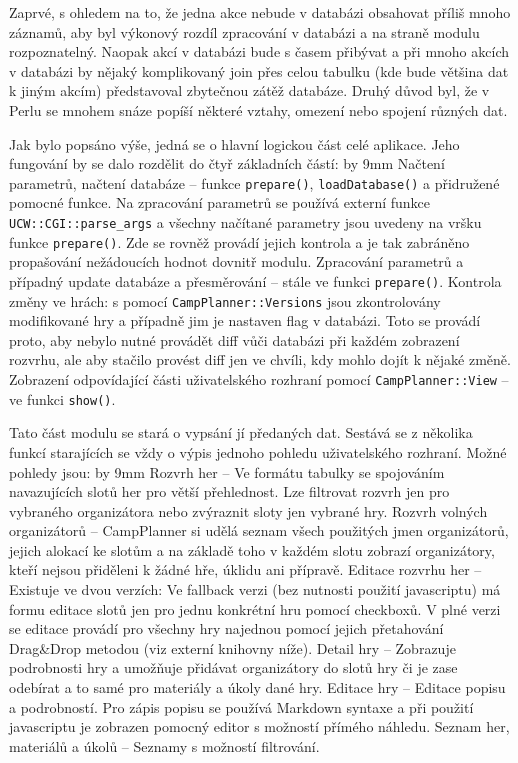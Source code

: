 Zaprvé, s ohledem na to, že jedna akce nebude v databázi obsahovat příliš mnoho
záznamů, aby byl výkonový rozdíl zpracování v databázi a na straně modulu
rozpoznatelný. Naopak akcí v databázi bude s časem přibývat a při mnoho akcích v
databázi by nějaký komplikovaný join přes celou tabulku (kde bude většina dat k
jiným akcím) představoval zbytečnou zátěž databáze. Druhý důvod byl, že v Perlu
se mnohem snáze popíší některé vztahy, omezení nebo spojení různých dat.


Jak bylo popsáno výše, jedná se o hlavní logickou část celé aplikace. Jeho
fungování by se dalo rozdělit do čtyř základních částí:
\itemize\ibull
\advance\hsize by 9mm
\: Načtení parametrů, načtení databáze -- funkce \verb|prepare()|, \verb|loadDatabase()|
a přidružené pomocné funkce. Na zpracování parametrů se používá externí
funkce \verb|UCW::CGI::parse_args| a všechny načítané parametry jsou uvedeny na
vršku funkce \verb|prepare()|. Zde se rovněž provádí jejich kontrola a je tak
zabráněno propašování nežádoucích hodnot dovnitř modulu.
\: Zpracování parametrů a případný update databáze a přesměrování -- stále ve
funkci \verb|prepare()|.
\: Kontrola změny ve hrách: s pomocí \verb|CampPlanner::Versions| jsou zkontrolovány
modifikované hry a případně jim je nastaven flag v databázi. Toto se provádí proto,
aby nebylo nutné provádět diff vůči databázi při každém zobrazení rozvrhu, ale
aby stačilo provést diff jen ve chvíli, kdy mohlo dojít k nějaké změně.
\: Zobrazení odpovídající části uživatelského rozhraní pomocí \verb|CampPlanner::View|
-- ve funkci \verb|show()|.
\endlist


Tato část modulu se stará o vypsání jí předaných dat. Sestává se z několika
funkcí starajících se vždy o výpis jednoho pohledu uživatelského rozhraní. Možné
pohledy jsou:
\itemize\ibull
\advance\hsize by 9mm
\: Rozvrh her -- Ve formátu tabulky se spojováním navazujících slotů her pro větší
přehlednost. Lze filtrovat rozvrh jen pro vybraného organizátora nebo zvýraznit
sloty jen vybrané hry.
\: Rozvrh volných organizátorů -- CampPlanner si udělá seznam všech použitých
jmen organizátorů, jejich alokací ke slotům a na základě toho v každém slotu
zobrazí organizátory, kteří nejsou přiděleni k žádné hře, úklidu ani přípravě.
\: Editace rozvrhu her -- Existuje ve dvou verzích: Ve fallback verzi (bez
nutnosti použití javascriptu) má formu editace slotů jen pro jednu konkrétní hru
pomocí checkboxů. V plné verzi se editace provádí pro všechny hry najednou
pomocí jejich přetahování Drag\&Drop metodou (viz externí knihovny níže).
\: Detail hry -- Zobrazuje podrobnosti hry a umožňuje přidávat organizátory do
slotů hry či je zase odebírat a to samé pro materiály a úkoly dané hry.
\: Editace hry -- Editace popisu a podrobností. Pro zápis popisu se používá
Markdown syntaxe a při použití javascriptu je zobrazen pomocný editor s možností
přímého náhledu.
\: Seznam her, materiálů a úkolů -- Seznamy s možností filtrování.
\endlist

